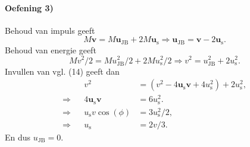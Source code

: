\documentclass[11pt]{article}
\begin{document}
\paragraph{Oefening 3)} 
Behoud van impuls geeft
\begin{equation}
    M\boldsymbol{v} = M\boldsymbol{u_{\mathrm{JB}}} + 2M\boldsymbol{u_{\mathrm{s}}} \Rightarrow \boldsymbol{u_{\mathrm{JB}}} = \boldsymbol{v} - 2\boldsymbol{u_{\mathrm{s}}}.
\end{equation}
Behoud van energie geeft
\begin{equation}
    Mv^2/2 = Mu_{\mathrm{JB}}^2/2 + 2Mu_{\mathrm{s}}^2/2 \Rightarrow v^2 = u_{\mathrm{JB}}^2 + 2u_{\mathrm{s}}^2.
\end{equation}
Invullen van vgl. (14) geeft dan
\begin{align}
    &&v^2 &= (v^2 - 4\boldsymbol{u_{\mathrm{s}}} \boldsymbol{v} + 4u_{\mathrm{s}}^2) + 2u_{\mathrm{s}}^2,\\
    \Rightarrow&&4\boldsymbol{u_{\mathrm{s}}} \boldsymbol{v} & = 6u_{\mathrm{s}}^2.\\
    \Rightarrow&&u_{\mathrm{s}}v \cos(\phi) &= 3u_{\mathrm{s}}^2/2,\\
    \Rightarrow&&u_{\mathrm{s}} &= 2v/3.
\end{align}
En dus $u_{\mathrm{JB}} = 0$.\\
\end{document}

